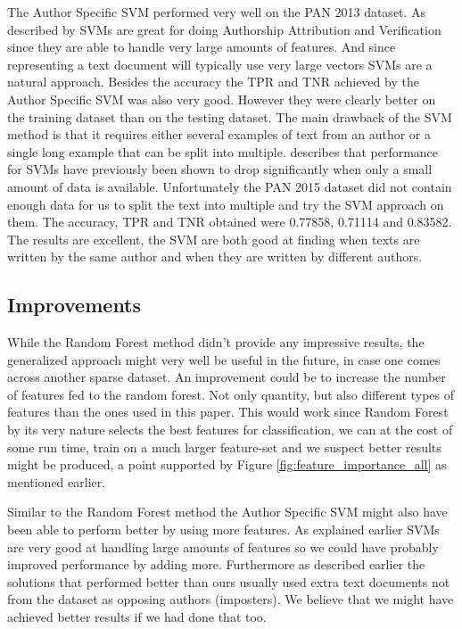 The Author Specific SVM performed very well on the PAN 2013 dataset. As
described by \cite{stamatos2009} \gls{SVM}s are great for doing Authorship
Attribution and Verification since they are able to handle very large amounts of
features. And since representing a text document will typically use very large
vectors \gls{SVM}s are a natural approach. Besides the accuracy the \gls{TPR}
and \gls{TNR} achieved by the Author Specific SVM was also very good. However
they were clearly better on the training dataset than on the testing dataset.
The main drawback of the SVM method is that it requires either several examples
of text from an author or a single long example that can be split into multiple.
\cite{stamatos2009} describes that performance for \gls{SVM}s have previously
been shown to drop significantly when only a small amount of data is available.
Unfortunately the PAN 2015 dataset did not contain enough data for us to split
the text into multiple and try the SVM approach on them. The accuracy, \gls{TPR}
and \gls{TNR} obtained were 0.77858, 0.71114 and 0.83582. The results are
excellent, the \gls{SVM} are both good at finding when texts are written by the
same author and when they are written by different authors.

\subsection{Improvements}
While the Random Forest method didn't provide any impressive results, the
generalized approach might very well be useful in the future, in case one
comes across another sparse dataset. An improvement could be to increase the
number of features fed to the random forest. Not only quantity, but also
different types of features than the ones used in this paper. This would
work since Random Forest by its very nature selects the best features for
classification, we can at the cost of some run time, train on a much larger
feature-set and we suspect better results might be produced, a point supported
by Figure \ref{fig:feature_importance_all} as mentioned earlier.

Similar to the Random Forest method the Author Specific SVM might also have been
able to perform better by using more features. As explained earlier \gls{SVM}s
are very good at handling large amounts of features so we could have probably
improved performance by adding more. Furthermore as described earlier the
solutions that performed better than ours usually used extra text documents not
from the dataset as opposing authors (imposters). We believe that we might have
achieved better results if we had done that too.

